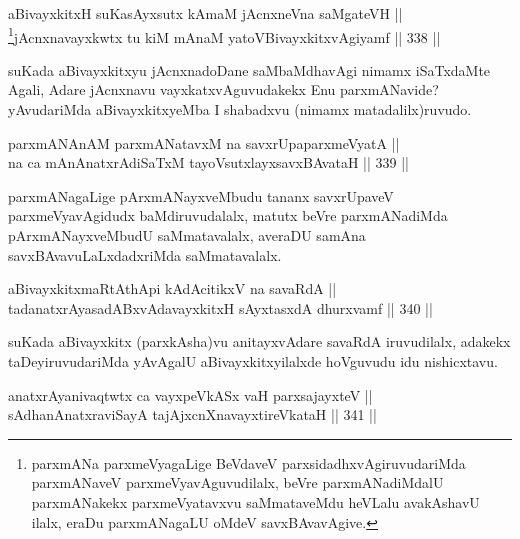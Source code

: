 \begin{shl}
aBivayxkitxH suKasAyxsutx kAmaM jAcnxneVna saMgateVH || \\
\footnote{parxmANa parxmeVyagaLige BeVdaveV parxsidadhxvAgiruvudariMda
parxmANaveV parxmeVyavAguvudilalx, beVre parxmANadiMdalU
parxmANakekx parxmeVyatavxvu saMmataveMdu heVLalu avakAshavU ilalx,
eraDu parxmANagaLU oMdeV savxBAvavAgive.}jAcnxnavayxkwtx tu kiM mAnaM yatoV\s BivayxkitxvAgiyamf \hfill || 338 ||  
\end{shl}


\begin{artha}
suKada aBivayxkitxyu jAcnxnadoDane saMbaMdhavAgi nimamx
iSaTxdaMte Agali, Adare jAcnxnavu vayxkatxvAguvudakekx Enu
parxmANavide? yAvudariMda aBivayxkitxyeMba I shabadxvu (nimamx
matadalilx)ruvudo. 
\end{artha}


\begin{shl}
parxmANAnAM parxmANatavxM na savxrUpaparxmeVyatA || \\
na ca mAnAnatxrAdiSaTxM tayoVsutxlayxsavxBAvataH \hfill || 339 ||  
\end{shl}

\begin{artha}
parxmANagaLige pArxmANayxveMbudu tananx savxrUpaveV parxmeVyavAgidudx
baMdiruvudalalx, matutx beVre parxmANadiMda pArxmANayxveMbudU
saMmatavalalx, averaDU samAna savxBAvavuLaLxdadxriMda saMmatavalalx.
\end{artha}


\begin{shl}
aBivayxkitxmaRtA\s thApi kAdAcitikxV na savaRdA || \\
tadanatxrAyasadABxvAdavayxkitxH sAyxtasxdA dhurxvamf \hfill || 340 ||  
\end{shl}

\begin{artha}
suKada aBivayxkitx (parxkAsha)vu anitayxvAdare savaRdA iruvudilalx,
adakekx taDeyiruvudariMda yAvAgalU aBivayxkitxyilalxde hoVguvudu idu nishicxtavu.
\end{artha}


\begin{shl}
anatxrAyanivaqtwtx ca vayxpeVkASx vaH parxsajayxteV ||  \\
sAdhanAnatxraviSayA tajAjxcnXnavayxtireVkataH \hfill || 341 ||  
\end{shl}

